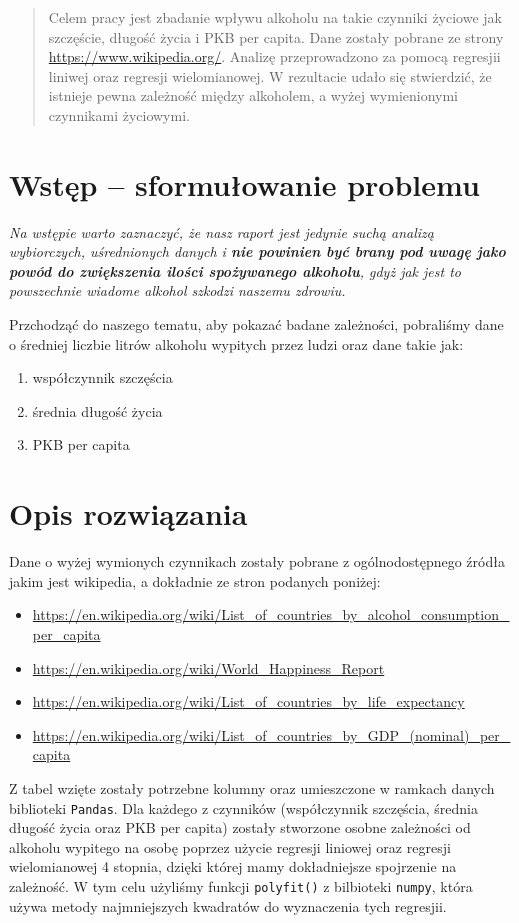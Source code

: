 \documentclass[10pt]{article}
\begin{document}


\begin{abstract}
Celem pracy jest zbadanie wpływu alkoholu na takie czynniki życiowe jak szczęście, długość życia i PKB per capita.
Dane zostały pobrane ze strony \url{https://www.wikipedia.org/}.
Analizę przeprowadzono za pomocą regresjii liniwej oraz regresji wielomianowej.
W rezultacie udało się stwierdzić, że istnieje pewna zależność między alkoholem, a wyżej wymienionymi czynnikami życiowymi.
\end{abstract}

\section{Wstęp -- sformułowanie problemu}
\label{sec:wstep}

\textit{Na wstępie warto zaznaczyć, że nasz raport jest jedynie suchą analizą wybiorczych, uśrednionych danych i \textbf{nie powinien być brany pod uwagę jako powód do zwiększenia ilości spożywanego alkoholu}, gdyż jak jest to powszechnie wiadome alkohol szkodzi naszemu zdrowiu.}

Przchodząć do naszego tematu, aby pokazać badane zależności, pobraliśmy dane o średniej liczbie litrów alkoholu wypitych przez ludzi oraz dane takie jak:
\begin{enumerate}
    \item współczynnik szczęścia
    \item średnia długość życia
    \item PKB per capita
\end{enumerate}

\section{Opis rozwiązania}

Dane o wyżej wymionych czynnikach zostały pobrane z ogólnodostępnego źródła jakim jest wikipedia, a dokładnie ze stron podanych poniżej:
\begin{itemize}
    \item \url{https://en.wikipedia.org/wiki/List_of_countries_by_alcohol_consumption_per_capita}
    \item \url{https://en.wikipedia.org/wiki/World_Happiness_Report}
    \item \url{https://en.wikipedia.org/wiki/List_of_countries_by_life_expectancy}
    \item \url{https://en.wikipedia.org/wiki/List_of_countries_by_GDP_(nominal)_per_capita}
\end{itemize}
Z tabel wzięte zostały potrzebne kolumny oraz umieszczone w ramkach danych biblioteki \texttt{Pandas}.
Dla każdego z czynników (współczynnik szczęścia, średnia długość życia oraz PKB per capita) zostały stworzone osobne zależności od alkoholu wypitego na osobę poprzez użycie regresji liniowej oraz regresji wielomianowej 4 stopnia, dzięki której mamy dokładniejsze spojrzenie na zależność.
W tym celu użyliśmy funkcji \texttt{polyfit()} z bilbioteki \texttt{numpy}, która używa metody najmniejszych kwadratów do wyznaczenia tych regresjii.
\pagebreak
\end{document}
